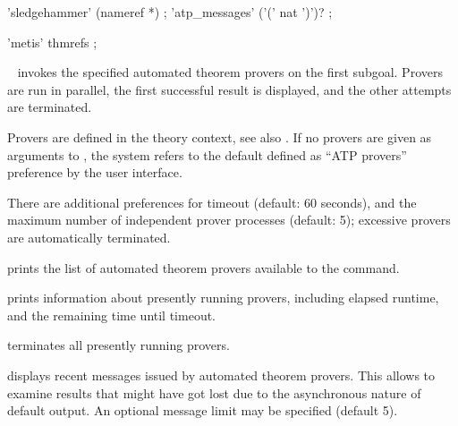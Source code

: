 \begin{isabellebody}
\begin{isamarkuptext}
  \begin{rail}
  'sledgehammer' (nameref *)
  ;
  'atp\_messages' ('(' nat ')')?
  ;

  'metis' thmrefs
  ;
  \end{rail}

  \begin{description}

  \item \hyperlink{command.HOL.sledgehammer}{\mbox{}}~
  invokes the specified automated theorem provers on the first
  subgoal.  Provers are run in parallel, the first successful result
  is displayed, and the other attempts are terminated.

  Provers are defined in the theory context, see also \hyperlink{command.HOL.print-atps}{\mbox{}}.  If no provers are given as arguments to \hyperlink{command.HOL.sledgehammer}{\mbox{}}, the system refers to the default defined as
  ``ATP provers'' preference by the user interface.

  There are additional preferences for timeout (default: 60 seconds),
  and the maximum number of independent prover processes (default: 5);
  excessive provers are automatically terminated.

  \item \hyperlink{command.HOL.print-atps}{\mbox{}} prints the list of automated
  theorem provers available to the \hyperlink{command.HOL.sledgehammer}{\mbox{}}
  command.

  \item \hyperlink{command.HOL.atp-info}{\mbox{}} prints information about presently
  running provers, including elapsed runtime, and the remaining time
  until timeout.

  \item \hyperlink{command.HOL.atp-kill}{\mbox{}} terminates all presently running
  provers.

  \item \hyperlink{command.HOL.atp-messages}{\mbox{}} displays recent messages issued
  by automated theorem provers.  This allows to examine results that
  might have got lost due to the asynchronous nature of default
  \hyperlink{command.HOL.sledgehammer}{\mbox{}} output.  An optional message limit may
  be specified (default 5).


\end{description}
\end{isamarkuptext}
\end{isabellebody}
